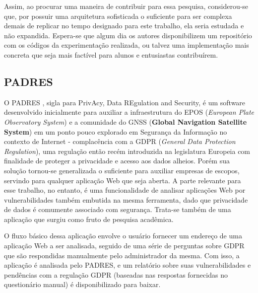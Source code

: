 Assim, ao procurar uma maneira de contribuir para essa pesquisa, considerou-se que, por possuir uma arquitetura sofisticada o suficiente para ser complexa demais de replicar no tempo designado para este trabalho, ela seria estudada e não expandida. Espera-se que algum dia os autores disponibilizem um repositório com os códigos da experimentação realizada, ou talvez uma implementação mais concreta que seja mais factível para alunos e entusiastas contribuírem.

\subsection{PADRES}

O PADRES \cite{pereira_padres_2022}, sigla para PrivAcy, Data REgulation and Security, é um software desenvolvido inicialmente para auxiliar a infraestrutura do EPOS (\textit{European Plate Observatory System}) e a comunidade do GNSS (\textbf{Global Navigation Satellite System}) em um ponto pouco explorado em Segurança da Informação no contexto de Internet - complacência com a GDPR (\textit{General Data Protection Regulation}), uma regulação então recém introduzida na legislatura Europeia com finalidade de proteger a privacidade e acesso aos dados alheios. Porém sua solução tornou-se generalizada o suficiente para auxiliar empresas de escopos, servindo para qualquer aplicação Web que seja aberta. A parte relevante para esse trabalho, no entanto, é uma funcionalidade de analisar aplicações Web por vulnerabilidades também embutida na mesma ferramenta, dado que privacidade de dados é comumente associado com segurança. Trata-se também de uma aplicação que surgiu como fruto de pesquisa acadêmica.

O fluxo básico dessa aplicação envolve o usuário fornecer um endereço de uma aplicação Web a ser analisada, seguido de uma série de perguntas sobre GDPR que são respondidas manualmente pelo administrador da mesma. Com isso, a aplicação é analisada pelo PADRES, e um relatório sobre suas vulnerabilidades e pendências com a regulação GDPR (baseadas nas respostas fornecidas no questionário manual) é disponibilizado para baixar. 

